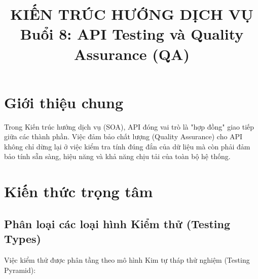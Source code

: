 \documentclass[12pt, a4paper]{article}
\title{\textbf{KIẾN TRÚC HƯỚNG DỊCH VỤ} \\ \vspace{0.5cm} \Large Buổi 8: API Testing và Quality Assurance (QA)}
\date{}
\begin{document}
\maketitle

\section{Giới thiệu chung}
Trong Kiến trúc hướng dịch vụ (SOA), API đóng vai trò là "hợp đồng" giao tiếp giữa các thành phần. Việc đảm bảo chất lượng (Quality Assurance) cho API không chỉ dừng lại ở việc kiểm tra tính đúng đắn của dữ liệu mà còn phải đảm bảo tính sẵn sàng, hiệu năng và khả năng chịu tải của toàn bộ hệ thống.

\section{Kiến thức trọng tâm}

\subsection{Phân loại các loại hình Kiểm thử (Testing Types)}
Việc kiểm thử được phân tầng theo mô hình Kim tự tháp thử nghiệm (Testing Pyramid):
\end{document}
